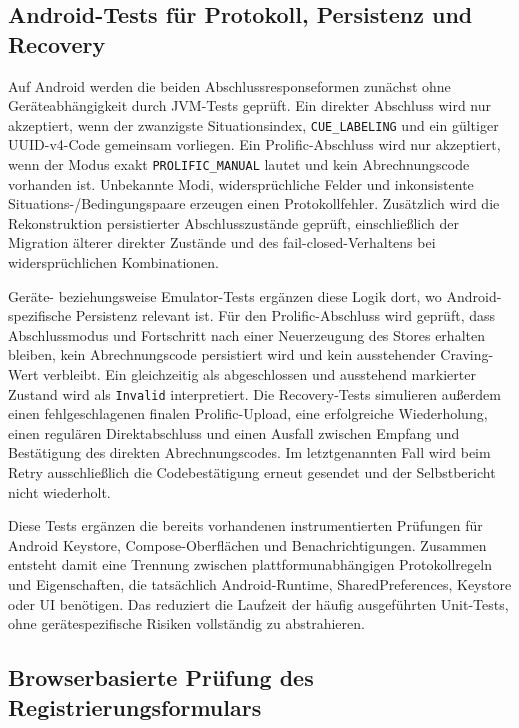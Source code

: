 \begin{neu}
\subsection{Android-Tests für Protokoll, Persistenz und Recovery}

Auf Android werden die beiden Abschlussresponseformen zunächst ohne Geräteabhängigkeit durch JVM-Tests geprüft. Ein direkter Abschluss wird nur akzeptiert, wenn der zwanzigste Situationsindex, \texttt{CUE\_LABELING} und ein gültiger UUID-v4-Code gemeinsam vorliegen. Ein Prolific-Abschluss wird nur akzeptiert, wenn der Modus exakt \texttt{PROLIFIC\_MANUAL} lautet und kein Abrechnungscode vorhanden ist. Unbekannte Modi, widersprüchliche Felder und inkonsistente Situations-/Bedingungspaare erzeugen einen Protokollfehler. Zusätzlich wird die Rekonstruktion persistierter Abschlusszustände geprüft, einschließlich der Migration älterer direkter Zustände und des fail-closed-Verhaltens bei widersprüchlichen Kombinationen.

Geräte- beziehungsweise Emulator-Tests ergänzen diese Logik dort, wo Android-spezifische Persistenz relevant ist. Für den Prolific-Abschluss wird geprüft, dass Abschlussmodus und Fortschritt nach einer Neuerzeugung des Stores erhalten bleiben, kein Abrechnungscode persistiert wird und kein ausstehender Craving-Wert verbleibt. Ein gleichzeitig als abgeschlossen und ausstehend markierter Zustand wird als \texttt{Invalid} interpretiert. Die Recovery-Tests simulieren außerdem einen fehlgeschlagenen finalen Prolific-Upload, eine erfolgreiche Wiederholung, einen regulären Direktabschluss und einen Ausfall zwischen Empfang und Bestätigung des direkten Abrechnungscodes. Im letztgenannten Fall wird beim Retry ausschließlich die Codebestätigung erneut gesendet und der Selbstbericht nicht wiederholt.

Diese Tests ergänzen die bereits vorhandenen instrumentierten Prüfungen für Android Keystore, Compose-Oberflächen und Benachrichtigungen. Zusammen entsteht damit eine Trennung zwischen plattformunabhängigen Protokollregeln und Eigenschaften, die tatsächlich Android-Runtime, SharedPreferences, Keystore oder UI benötigen. Das reduziert die Laufzeit der häufig ausgeführten Unit-Tests, ohne gerätespezifische Risiken vollständig zu abstrahieren.

\subsection{Browserbasierte Prüfung des Registrierungsformulars}


\end{neu}
